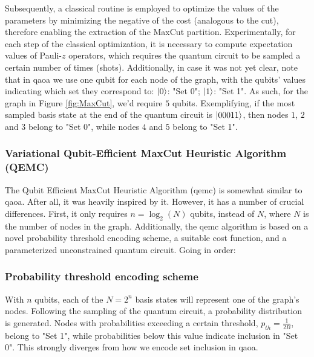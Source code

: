 Subsequently, a classical routine is employed to optimize the values of the parameters by minimizing the negative of the cost (analogous to the cut), therefore enabling the extraction of the MaxCut partition. Experimentally, for each step of the classical optimization, it is necessary to compute expectation values of Pauli-$z$ operators, which requires the quantum circuit to be sampled a certain number of times (shots). Additionally, in case it was not yet clear, note that in \acrshort{qaoa} we use one qubit for each node of the graph, with the qubits' values indicating which set they correspond to: $\ket{0}$: "Set 0"; $\ket{1}$: "Set 1". As such, for the graph in Figure \ref{fig:MaxCut}, we'd require $5$ qubits. Exemplifying, if the most sampled basis state at the end of the quantum circuit is $\ket{00011}$, then nodes $1$, $2$ and $3$ belong to "Set 0", while nodes $4$ and $5$ belong to "Set 1".


\subsubsection{Variational Qubit-Efficient MaxCut Heuristic Algorithm (QEMC)}
\label{subsubsection:QEMC}


The Qubit Efficient MaxCut Heuristic Algorithm (\acrshort{qemc}) \cite{tenecohen2023variational} is somewhat similar to \acrshort{qaoa}. After all, it was heavily inspired by it. However, it has a number of crucial differences. First, it only requires $n = \log_2(N)$ qubits, instead of $N$, where $N$ is the number of nodes in the graph. Additionally, the \acrshort{qemc} algorithm is based on a novel probability threshold encoding scheme, a suitable cost function, and a parameterized unconstrained quantum circuit. Going in order:

\subsubsection*{\small Probability threshold encoding scheme}
With $n$ qubits, each of the $N = 2^{n}$ basis states will represent one of the graph's nodes. Following the sampling of the quantum circuit, a probability distribution is generated. Nodes with probabilities exceeding a certain threshold, $p_{th} = \frac{1}{2B}$, belong to "Set 1", while probabilities below this value indicate inclusion in "Set 0". This strongly diverges from how we encode set inclusion in \acrshort{qaoa}.

